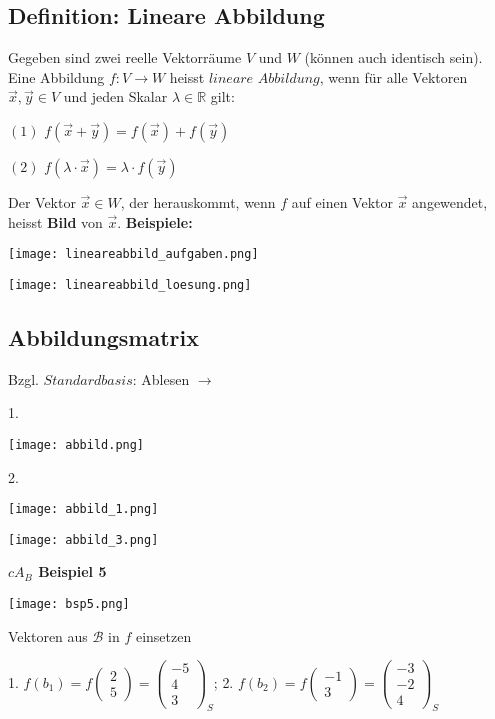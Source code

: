\begin{multicols*}{3}
    \subsection{Definition: Lineare Abbildung}
    { Gegeben sind zwei reelle Vektorräume $V$ und $W$ (können auch identisch sein).}
    {Eine Abbildung $f:V \rightarrow W$ heisst $lineare$ $Abbildung$, wenn für alle Vektoren $\vec{x},\vec{y} \in  V$ und jeden Skalar $\lambda \in \mathbb{R} $ gilt:}

    {$(1)$ $f(\vec{x}+\vec{y})=f(\vec{x}) + f(\vec{y})$}

    {$(2)$ $f(\lambda \cdot \vec{x})=\lambda \cdot f(\vec{y})$}
    \WhiteSpace

    {Der Vektor $\vec{x} \in W$, der herauskommt, wenn $f$ auf einen Vektor $\vec{x}$ angewendet, heisst \textbf{Bild} von $\vec{x}$.}
    \WhiteSpace
    {\textbf{Beispiele:}}

    {\texttt{[image: lineareabbild\_aufgaben.png]}}

    {\texttt{[image: lineareabbild\_loesung.png]}}
    \vfill\null
    \columnbreak
    \subsection{Abbildungsmatrix}
    {Bzgl. $Standardbasis$: Ablesen $\to$}

    {1.}

    {\texttt{[image: abbild.png]}}

    {2.}

    {\texttt{[image: abbild\_1.png]}}

    {\texttt{[image: abbild\_3.png]}}

    {\textbf{$cA_B$ Beispiel 5} }

    {\texttt{[image: bsp5.png]}}

    { Vektoren aus $\mathcal{B} $ in $f$ einsetzen}

    {1. $ f(b_1) = f(\begin{matrix}
                2 \\
                5
            \end{matrix}) = \begin{pmatrix}
                -5 \\
                4  \\
                3
            \end{pmatrix}_S$; }{ 2. $ f(b_2) = f(\begin{matrix}
                -1 \\
                3
            \end{matrix}) = \begin{pmatrix}
                -3 \\
                -2 \\
                4
            \end{pmatrix}_S$}


\end{multicols*}
